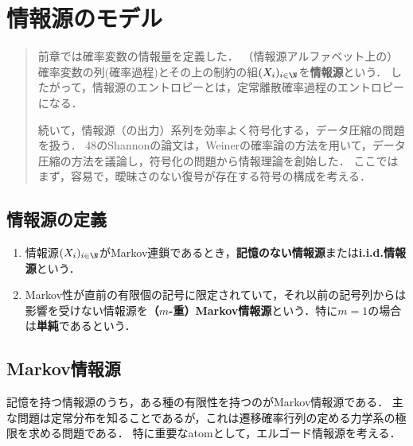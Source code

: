 \documentclass[uplatex,dvipdfmx]{jsreport}
\begin{document}
\chapter{情報源のモデル}

\begin{quotation}
    前章では確率変数の情報量を定義した．
    （情報源アルファベット上の）確率変数の列(確率過程)とその上の制約の組$(X_i)_{i\in\N}$を\textbf{情報源}という．
    したがって，情報源のエントロピーとは，定常離散確率過程のエントロピーになる．

    続いて，情報源（の出力）系列を効率よく符号化する，データ圧縮の問題を扱う．
    48のShannonの論文は，Weinerの確率論の方法を用いて，データ圧縮の方法を議論し，符号化の問題から情報理論を創始した．
    ここではまず，容易で，曖昧さのない復号が存在する符号の構成を考える．
\end{quotation}

\section{情報源の定義}

\begin{definition}\mbox{}
    \begin{enumerate}
        \item 情報源$(X_i)_{i\in\N}$がMarkov連鎖であるとき，\textbf{記憶のない情報源}または\textbf{i.i.d.情報源}という．
        \item Markov性が直前の有限個の記号に限定されていて，それ以前の記号列からは影響を受けない情報源を\textbf{（$m$-重）Markov情報源}という．特に$m=1$の場合は\textbf{単純}であるという．
    \end{enumerate}
\end{definition}

\section{Markov情報源}

\begin{tcolorbox}[colframe=ForestGreen, colback=ForestGreen!10!white,breakable,colbacktitle=ForestGreen!40!white,coltitle=black,fonttitle=\bfseries\sffamily,
title=]
    記憶を持つ情報源のうち，ある種の有限性を持つのがMarkov情報源である．
    主な問題は定常分布を知ることであるが，これは遷移確率行列の定める力学系の極限を求める問題である．
    特に重要なatomとして，エルゴード情報源を考える．
\end{tcolorbox}
\end{document}
